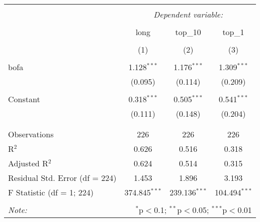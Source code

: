 
\begin{table}[!htbp] \centering 
  \caption{} 
  \label{} 
\begin{tabular}{@{\extracolsep{5pt}}lccc} 
\\[-1.8ex]\hline 
\hline \\[-1.8ex] 
 & \multicolumn{3}{c}{\textit{Dependent variable:}} \\ 
\cline{2-4} 
\\[-1.8ex] & long & top\_10 & top\_1 \\ 
\\[-1.8ex] & (1) & (2) & (3)\\ 
\hline \\[-1.8ex] 
 bofa & 1.128$^{***}$ & 1.176$^{***}$ & 1.309$^{***}$ \\ 
  & (0.095) & (0.114) & (0.209) \\ 
  & & & \\ 
 Constant & 0.318$^{***}$ & 0.505$^{***}$ & 0.541$^{***}$ \\ 
  & (0.111) & (0.148) & (0.204) \\ 
  & & & \\ 
\hline \\[-1.8ex] 
Observations & 226 & 226 & 226 \\ 
R$^{2}$ & 0.626 & 0.516 & 0.318 \\ 
Adjusted R$^{2}$ & 0.624 & 0.514 & 0.315 \\ 
Residual Std. Error (df = 224) & 1.453 & 1.896 & 3.193 \\ 
F Statistic (df = 1; 224) & 374.845$^{***}$ & 239.136$^{***}$ & 104.494$^{***}$ \\ 
\hline 
\hline \\[-1.8ex] 
\textit{Note:}  & \multicolumn{3}{r}{$^{*}$p$<$0.1; $^{**}$p$<$0.05; $^{***}$p$<$0.01} \\ 
\end{tabular} 
\end{table} 
